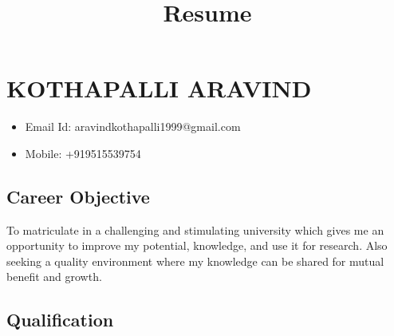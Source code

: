 \documentclass[
  letterpaper,
  DIV=11,
  numbers=noendperiod]{scrartcl}
\title{Resume}
\author{}
\date{}
\providecommand{\tightlist}{%
  \setlength{\itemsep}{0pt}\setlength{\parskip}{0pt}}\usepackage{longtable,booktabs,array}
\begin{document}
\maketitle
\ifdefined\Shaded\renewenvironment{Shaded}{\begin{tcolorbox}[frame hidden, borderline west={3pt}{0pt}{shadecolor}, sharp corners, boxrule=0pt, breakable, enhanced, interior hidden]}{\end{tcolorbox}}\fi

\hypertarget{kothapalli-aravind}{%
\section{KOTHAPALLI ARAVIND}\label{kothapalli-aravind}}

\begin{itemize}
\tightlist
\item
  Email Id: aravindkothapalli1999@gmail.com
\item
  Mobile: +919515539754
\end{itemize}

\hypertarget{career-objective}{%
\subsection{Career Objective}\label{career-objective}}

To matriculate in a challenging and stimulating university which gives
me an opportunity to improve my potential, knowledge, and use it for
research. Also seeking a quality environment where my knowledge can be
shared for mutual benefit and growth.

\hypertarget{qualification}{%
\subsection{Qualification}\label{qualification}}
\end{document}
